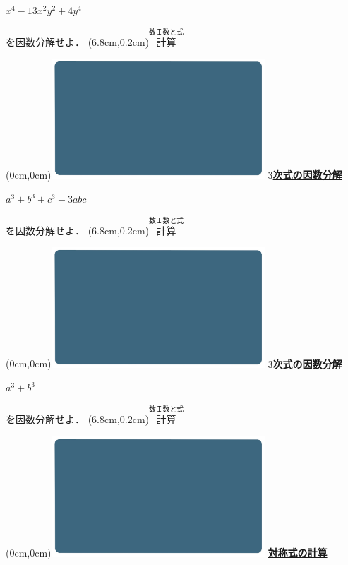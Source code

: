 \documentclass[10pt,
fleqn,
dvipdfmx,
uplatex
]{jsarticle}
\begin{document}
\Huge 
\bf\boldmath $x^4-{13}x^2y^2+4y^4$

\Large
\vspace{1zw}
\hfill を因数分解せよ．
\at(6.8cm,0.2cm){\small\color{bradorange}$\overset{\text{数Ｉ数と式}}{\text{計算}}$}

\newpage

\at(0cm,0cm){\includegraphics[width=8cm,bb=0 0 1920 1080]{./youtube/thumbnails/templates/smart_background/数I数と式.jpeg}}
{\color{orange}\bf\boldmath\huge\underline{$3$次式の因数分解}}\vspace{0.5zw}

\Huge 
\bf\boldmath $a^3+b^3+c^3-3abc$

\Large
\vspace{1zw}
\hfill を因数分解せよ．
\at(6.8cm,0.2cm){\small\color{bradorange}$\overset{\text{数Ｉ数と式}}{\text{計算}}$}

\newpage

\at(0cm,0cm){\includegraphics[width=8cm,bb=0 0 1920 1080]{./youtube/thumbnails/templates/smart_background/数I数と式.jpeg}}
{\color{orange}\bf\boldmath\huge\underline{$3$次式の因数分解}}\vspace{0.5zw}

\fontsize{50}{0} \selectfont
\bf\boldmath 
\hspace{0.5zw}$a^3+b^3$

\Large
\vspace{1zw}
\hfill を因数分解せよ．
\at(6.8cm,0.2cm){\small\color{bradorange}$\overset{\text{数Ｉ数と式}}{\text{計算}}$}

\newpage

\at(0cm,0cm){\includegraphics[width=8cm,bb=0 0 1920 1080]{./youtube/thumbnails/templates/smart_background/数I数と式.jpeg}}
{\color{orange}\bf\boldmath\huge\underline{対称式の計算}}\vspace{0.3zw}
\end{document}
